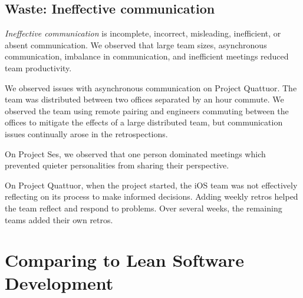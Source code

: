 \subsection{Waste: Ineffective communication}
\textit{Ineffective communication} is incomplete, incorrect, misleading, inefficient, or absent communication. We observed that large team sizes, asynchronous communication, imbalance in communication, and inefficient meetings reduced team productivity.

We observed issues with asynchronous communication on Project Quattuor. The team was distributed between two offices separated by an hour commute. We observed the team using remote pairing and engineers commuting between the offices to mitigate the effects of a large distributed team, but communication issues continually arose in the retrospections.

On Project Ses, we observed that one person dominated meetings which prevented quieter personalities from sharing their perspective. 

On Project Quattuor, when the project started, the iOS team was not effectively reflecting on its process to make informed decisions. Adding weekly retros helped the team reflect and respond to problems. Over several weeks, the remaining teams added their own retros. 










\section{Comparing to Lean Software Development}
\label{LeanSoftwareDevelopmentComparison}

